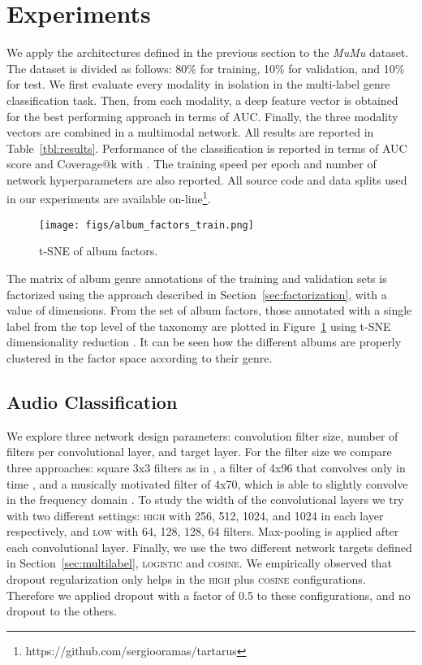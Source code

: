 \documentclass{article}
\begin{document}
\section{Experiments}\label{sec:experiments}

We apply the architectures defined in the previous section to the \emph{MuMu} dataset. 
The dataset is divided as follows: 80\% for training, 10\% for validation, and 10\% for test. We first evaluate every modality in isolation in the multi-label genre classification task. 
Then, from each modality, a deep feature vector is obtained for the best performing approach in terms of AUC. 
Finally, the three modality vectors are combined in a multimodal network. 
All results are reported in Table~\ref{tbl:results}. 
Performance of the classification is reported in terms of AUC score and Coverage@k with . 
The training speed per epoch and number of network hyperparameters are also reported. 
All source code and data splits used in our experiments are available on-line\footnote{https://github.com/sergiooramas/tartarus}.

\begin{figure}[!htp]
\centerline{
\texttt{[image: figs/album\_factors\_train.png]}}
\caption{t-SNE of album factors.}
\label{fig:tsne}
\end{figure}

The matrix of album genre annotations of the training and validation sets is factorized using the approach described in Section~\ref{sec:factorization}, with a value of  dimensions.
From the set of album factors, those annotated with a single label from the top level of the taxonomy are plotted in Figure~\ref{fig:tsne} using t-SNE dimensionality reduction \cite{maaten2008visualizing}.
It can be seen how the different albums are properly clustered in the factor space according to their genre.


\subsection{Audio Classification}\label{sec:audioexp}

We explore three network design parameters: convolution filter size, number of filters per convolutional layer, and target layer. 
For the filter size we compare three approaches: square 3x3 filters as in \cite{Choi2016}, a filter of 4x96 that convolves only in time \cite{Oord2013}, and a musically motivated filter of 4x70, which is able to slightly convolve in the frequency domain \cite{pons2016experimenting}. 
To study the width of the convolutional layers we try with two different settings: \textsc{high} with 256, 512, 1024, and 1024 in each layer respectively, and \textsc{low} with 64, 128, 128, 64 filters. Max-pooling is applied after each convolutional layer.
Finally, we use the two different network targets defined in Section~\ref{sec:multilabel}, \textsc{logistic} and \textsc{cosine}. We empirically observed that dropout regularization only helps in the \textsc{high} plus \textsc{cosine} configurations. Therefore we applied dropout with a factor of 0.5 to these configurations, and no dropout to the others. 
\end{document}
